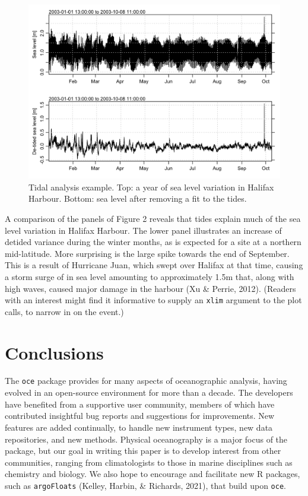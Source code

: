 \documentclass[10pt,a4paper,onecolumn]{article}
\begin{document}
\begin{figure}
\centering
\includegraphics{unnamed-chunk-5-1.png}
\caption{Tidal analysis example. Top: a year of sea level variation in
Halifax Harbour. Bottom: sea level after removing a fit to the tides.}
\end{figure}

A comparison of the panels of Figure 2 reveals that tides explain much
of the sea level variation in Halifax Harbour. The lower panel
illustrates an increase of detided variance during the winter months, as
is expected for a site at a northern mid-latitude. More surprising is
the large spike towards the end of September. This is a result of
Hurricane Juan, which swept over Halifax at that time, causing a storm
surge of in sea level amounting to approximately 1.5m that, along with
high waves, caused major damage in the harbour (Xu \& Perrie, 2012).
(Readers with an interest might find it informative to supply an
\texttt{xlim} argument to the plot calls, to narrow in on the event.)

\hypertarget{conclusions}{%
\section{Conclusions}\label{conclusions}}

The \texttt{oce} package provides for many aspects of oceanographic
analysis, having evolved in an open-source environment for more than a
decade. The developers have benefited from a supportive user community,
members of which have contributed insightful bug reports and suggestions
for improvements. New features are added continually, to handle new
instrument types, new data repositories, and new methods. Physical
oceanography is a major focus of the package, but our goal in writing
this paper is to develop interest from other communities, ranging from
climatologists to those in marine disciplines such as chemistry and
biology. We also hope to encourage and facilitate new R packages, such
as \texttt{argoFloats} (Kelley, Harbin, \& Richards, 2021), that build
upon \texttt{oce}.
\end{document}
